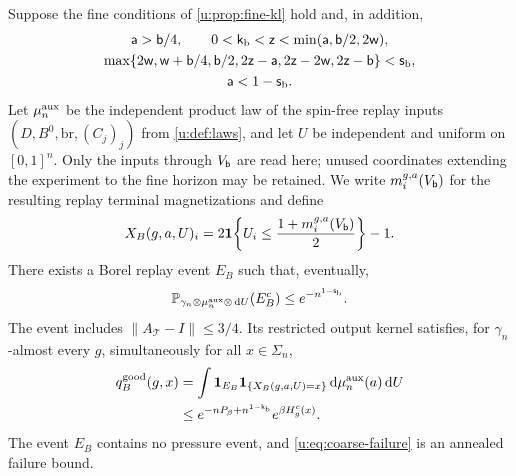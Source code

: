 \begin{proposition}\label{u:prop:coarse}
Suppose the fine conditions of \cref{u:prop:fine-kl} hold and, in addition,
\begin{equation}\label{u:eq:coarse-conditions}
\begin{gathered}
 \mathsf{a}>\mathsf{b}/4,\qquad
 0<\mathsf{k}_{\rm b}<\mathsf{z}<\min(\mathsf{a},\mathsf{b}/2,2\mathsf{w}),\\
 \max\{2\mathsf{w},\mathsf{w}+\mathsf{b}/4,\mathsf{b}/2,
       2\mathsf{z}-\mathsf{a},2\mathsf{z}-2\mathsf{w},2\mathsf{z}-\mathsf{b}\}<\mathsf{s}_{\rm b},\\
 \mathsf{a}<1-\mathsf{s}_{\rm b}.
\end{gathered}
\end{equation}
Let $\mu^{\rm aux}_n$ be the independent product law of the spin-free replay inputs $(D,B^0,\mathrm{br},(C_j)_j)$ from \cref{u:def:laws}, and let $U$ be independent and uniform on $[0,1]^n$. Only the inputs through $V_{\mathsf{b}}$ are read here; unused coordinates extending the experiment to the fine horizon may be retained. We write $m_i^{g,a}(V_{\mathsf{b}})$ for the resulting replay terminal magnetizations and define
\[
 X_B(g,a,U)_i
 =2\mathbf 1\!\left\{U_i\le
    \frac{1+m_i^{g,a}(V_{\mathsf{b}})}{2}\right\}-1.
\]
There exists a Borel replay event $E_B$ such that, eventually,
\begin{equation}\label{u:eq:coarse-failure}
 \mathbb P_{\gamma_n\otimes\mu^{\rm aux}_n\otimes\,\mathrm d U}(E_B^c)
 \le e^{-n^{1-\mathsf{s}_{\rm b}}}.
\end{equation}
The event includes $\|A_{\mathcal T}-I\|\le3/4$. Its restricted output kernel satisfies, for $\gamma_n$-almost every $g$, simultaneously for all $x\in\Sigma_n$,
\begin{equation}\label{u:eq:coarse-kernel}
\begin{aligned}
 q_B^{\rm good}(g,x)
 &=\int\mathbf 1_{E_B}\mathbf 1_{\{X_B(g,a,U)=x\}}
                      \,\mathrm d\mu^{\rm aux}_n(a)\,\mathrm d U\\
 &\le e^{-nP_\beta+n^{1-\mathsf{k}_{\rm b}}}e^{\beta H^c_g(x)}.
\end{aligned}
\end{equation}
The event $E_B$ contains no pressure event, and \eqref{u:eq:coarse-failure} is an annealed failure bound.
\end{proposition}


